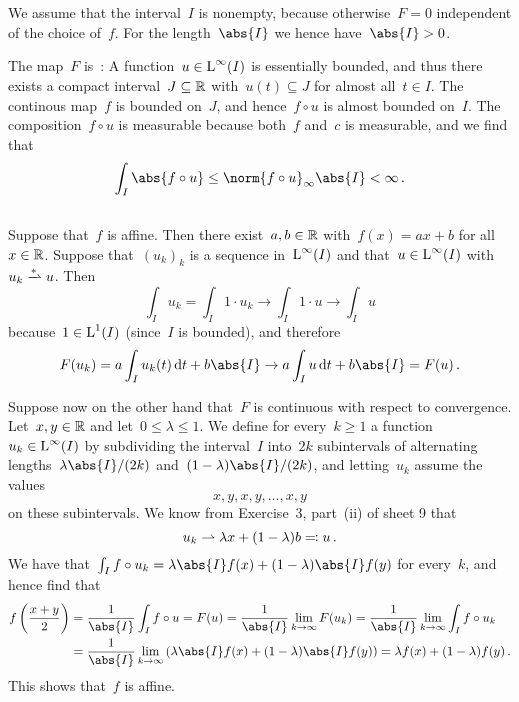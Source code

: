 \section{}

We assume that the interval~$I$ is nonempty, because otherwise~$F = 0$ independent of the choice of~$f$.
For the length~$\abs{I}$ we hence have~$\abs{I} > 0$.

The map~$F$ is~{\welldef}:
A function~$u \in \operatorname{L}^\infty(I)$ is essentially bounded, and thus there exists a compact interval~$J \subseteq \mathbb{R}$ with~$u(t) \subseteq J$ for almost all~$t \in I$.
The continous map~$f$ is bounded on~$J$, and hence~$f \circ u$ is almost bounded on~$I$.
The composition~$f \circ u$ is measurable because both~$f$ and~$c$ is measurable, and we find that
\[
  \int_I \abs{f \circ u}
  \leq
  \norm{f \circ u}_{\infty} \abs{I}
  <
  \infty  \,.
\]





\subsection{}
\label{continuous iff affine}

Suppose that~$f$ is affine.
Then there exist~$a, b \in \mathbb{R}$ with~$f(x) = ax + b$ for all~$x \in \mathbb{R}$.
Suppose that~$(u_k)_k$ is a sequence in~$\operatorname{L}^\infty(I)$ and that~$u \in \operatorname{L}^\infty(I)$ with~$u_k \wtostar u$.
Then
\[
  \int_I u_k
  =
  \int_I 1 \cdot u_k
  \to
  \int_I 1 \cdot u
  \to
  \int_I u
\]
because~$1 \in \operatorname{L}^1(I)$ (since~$I$ is bounded), and therefore
\[
  F(u_k)
  =
  a \int_I u_k(t) \dd{t} + b \abs{I}
  \to
  a \int_I u \dd{t} + b \abs{I}
  =
  F(u) \,.
\]

Suppose now on the other hand that~$F$ is continuous with respect to {\weakstar} convergence.
Let~$x, y \in \mathbb{R}$ and let~$0 \leq \lambda \leq 1$.
We define for every~$k \geq 1$ a function~$u_k \in \operatorname{L}^\infty(I)$ by subdividing the interval~$I$ into~$2k$ subintervals of alternating lengths~$\lambda \abs{I}/(2k)$ and~$(1-\lambda) \abs{I}/(2k)$, and letting~$u_k$ assume the values
\[
  x, y, x, y, \dotsc, x, y
\]
on these subintervals.
We know from Exercise~3, part~(ii) of sheet 9 that
\[
  u_k
  \rightharpoonup
  \lambda x + (1 - \lambda) b
  \eqqcolon
  u \,.
\]
We have that~$\int_I f \circ u_k = \lambda \abs{I} f(x) + (1 - \lambda) \abs{I} f(y)$ for every~$k$, and hence find that 
\begin{align*}
  f\left( \frac{x + y}{2} \right)
  &=
  \frac{1}{\abs{I}} \int_I f \circ u
  =
  F(u)
  =
  \frac{1}{\abs{I}} \lim_{k \to \infty} F(u_k)
  =
  \frac{1}{\abs{I}} \lim_{k \to \infty} \int_I f \circ u_k
  \\
  &=
  \frac{1}{\abs{I}}
  \lim_{k \to \infty}
  \left(
  \lambda \abs{I} f(x) + (1 - \lambda) \abs{I} f(y)
  \right)
  =
  \lambda f(x) + (1 - \lambda) f(y) \,.
\end{align*}
This shows that~$f$ is affine.





